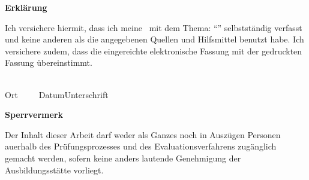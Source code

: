 

\newpage
\thispagestyle{empty}
\begin{framed}
\begin{center}
\Large\bfseries Erklärung
\end{center}
\medskip
\noindent
Ich versichere hiermit, dass ich meine \Was\ mit
dem Thema: \enquote{\Titel} selbstständig verfasst und keine anderen als die
angegebenen Quellen und Hilfsmittel benutzt habe. Ich versichere zudem, dass die eingereichte elektronische Fassung mit der
gedruckten Fassung übereinstimmt.

\vspace{3cm}
\noindent
\underline{\hspace{4cm}}\hfill\underline{\hspace{6cm}}\\
Ort~~~~~Datum\hfill Unterschrift\hspace{4cm}
\end{framed}

\vfill
\begin{framed}
\begin{center}
\Large\bfseries Sperrvermerk
\end{center}
\medskip
\noindent
Der Inhalt dieser Arbeit darf weder als Ganzes noch in Auszügen Personen
auerhalb des Prüfungsprozesses und des Evaluationsverfahrens zugänglich gemacht
werden, sofern keine anders lautende Genehmigung der Ausbildungsstätte vorliegt.
\end{framed}

\endinput
